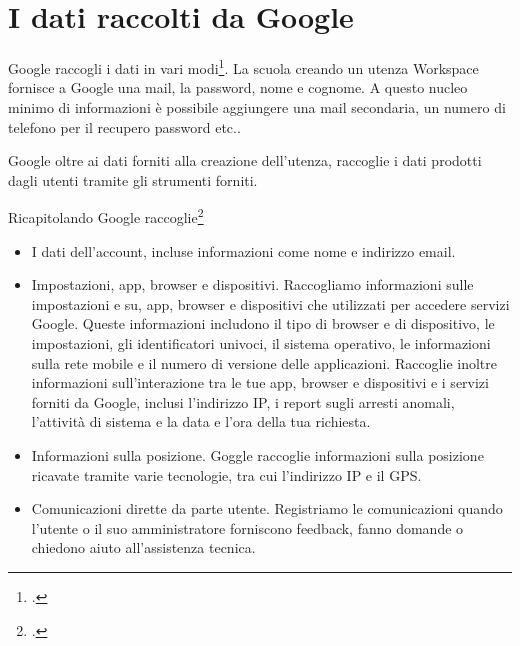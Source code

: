 \section{I dati raccolti da Google}
\textenglish{Google} raccogli i dati in vari modi\footcite{Google2022a}. La scuola creando un utenza Workspace fornisce a Google una mail, la password,  nome e  cognome. A questo nucleo minimo di informazioni è possibile aggiungere una mail secondaria, un numero di telefono per il recupero password etc..

Google oltre ai dati forniti alla creazione dell'utenza, raccoglie i dati prodotti dagli utenti tramite gli strumenti forniti. 

Ricapitolando Google raccoglie\footcite{Google2022a}
\begin{itemize}
	\item I dati dell'account, incluse informazioni come nome e indirizzo email.
	\item Impostazioni, app, browser e dispositivi. Raccogliamo informazioni sulle  impostazioni e su, app, browser e dispositivi che utilizzati per accedere  servizi Google. Queste informazioni includono il tipo di browser e di dispositivo, le impostazioni, gli identificatori univoci, il sistema operativo, le informazioni sulla rete mobile e il numero di versione delle applicazioni. Raccoglie inoltre informazioni sull'interazione tra le tue app, browser e dispositivi e i servizi forniti da Google, inclusi l'indirizzo IP, i report sugli arresti anomali, l'attività di sistema e la data e l'ora della tua richiesta.
	\item Informazioni sulla posizione. Goggle raccoglie informazioni sulla posizione ricavate tramite varie tecnologie, tra cui l'indirizzo IP e il GPS.
	\item Comunicazioni dirette da parte utente. Registriamo le comunicazioni quando l'utente o il suo amministratore forniscono feedback, fanno domande o chiedono aiuto all'assistenza tecnica.
\end{itemize}